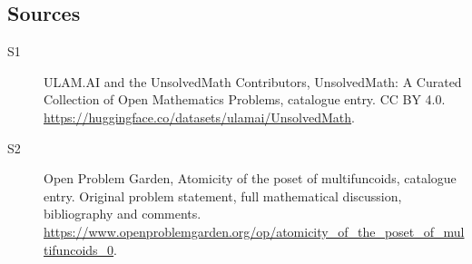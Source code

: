 \documentclass[11pt]{article}
\begin{document}
\subsection{Sources}
\begin{description}
\item[\hypertarget{source:statement:1}{S1}] ULAM.AI and the UnsolvedMath Contributors, UnsolvedMath: A Curated Collection of Open Mathematics Problems, catalogue entry. CC BY 4.0. \url{https://huggingface.co/datasets/ulamai/UnsolvedMath}.
\item[\hypertarget{source:statement:2}{S2}] Open Problem Garden, Atomicity of the poset of multifuncoids, catalogue entry. Original problem statement, full mathematical discussion, bibliography and comments. \url{https://www.openproblemgarden.org/op/atomicity_of_the_poset_of_multifuncoids_0}.
\end{description}
\label{end:statement}
\end{document}
